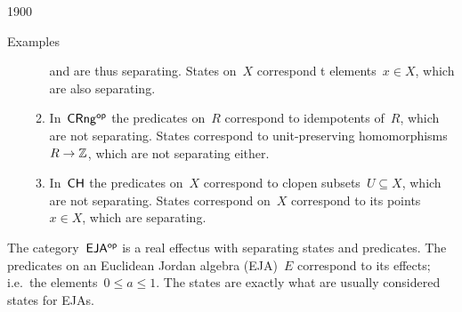 \begin{parsec}{1900}
\begin{point}{30}{Examples}
\begin{point}{40}
\begin{enumerate}
\begin{enumerate}
        and are thus separating. States on~$X$ correspond t
        elements~$x \in X$, which are also separating.
\item
In~${\mathsf{CRng}}{^{\mathsf{op}}}$ the predicates on~$R$ correspond to idempotents of~$R$,
    which are not separating.
        States correspond to unit-preserving
            homomorphisms~$R \to \mathbb{Z}$, which are not separating either.
\item
In~$\mathsf{CH}$ the predicates on~$X$ correspond to clopen subsets~$U \subseteq X$,
    which are not separating.
States correspond on~$X$ correspond to its points~$x \in X$,
    which are separating.
\end{enumerate}
\end{enumerate}
\end{point}
\spacingfix{}
\begin{point}{50}%
The category~${\mathsf{EJA}}{^{\mathsf{op}}}$ is a real effectus with separating states
    and predicates. The predicates on an Euclidean Jordan algebra (EJA)~$E$
    correspond to its effects; i.e.~the elements~$0 \leq a \leq 1$.
    The states are exactly what are usually considered
    states for EJAs.
\end{point}
\end{point}
\end{parsec}
